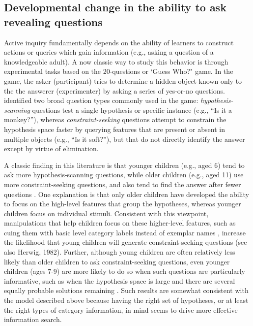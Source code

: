 \documentclass[man,floatsintext]{apa6}
\begin{document}

\subsection{Developmental change in the ability to ask revealing questions}

Active inquiry fundamentally depends on the ability of learners to construct actions or queries
which gain information (e.g., asking a question of a knowledgeable adult).
A now classic way to study this behavior is through experimental tasks based on the 20-questions or 
`Guess Who?" game.
In the game, the asker (participant) tries to determine a hidden object known
only to the the answerer (experimenter) by asking a series of yes-or-no questions.
 identified two broad question types commonly used in the game: \emph{hypothesis-scanning} 
questions test a single hypothesis or specific instance (e.g., ``Is it a monkey?''), whereas 
\emph{constraint-seeking} questions attempt to constrain the hypothesis space faster by 
querying features that are present or absent in multiple objects (e.g., ``Is it soft?''), 
but that do not directly identify the answer except by virtue of elimination. 

A classic finding in this literature is that younger children (e.g., aged 6) tend to ask more hypothesis-scanning questions, while older children (e.g., aged 11) use more constraint-seeking  questions, and also 
tend to find the answer after fewer questions \cite{Mosher:1966}. 
One explanation is that only older children have developed the ability to focus on the 
high-level features that group the hypotheses, whereas younger children focus on individual stimuli.
Consistent with this viewpoint, manipulations that help children focus on these higher-level features, such as cuing them with basic level category labels instead of exemplar names 
\cite{Ruggeri:2015front}, increase the likelihood that young children will generate constraint-seeking questions (see also Herwig, 1982).
Further, although young children are often relatively less likely than older children to ask constraint-seeking questions, even younger children (ages 7-9) are 
more likely to do so when such questions are particularly informative, such as when the hypothesis space is large and there are several equally probable solutions remaining \cite{Ruggeri:2014,Ruggeri:2015}.  Such results are somewhat consistent with the model described above because having the right set of hypotheses, or at least
the right types of category information, in mind seems to drive more effective information search.
\nocite{Herwig:1982}
\end{document}

